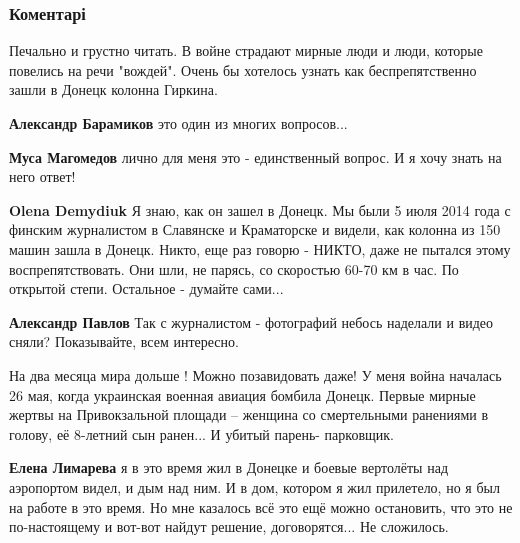  
 
 
 
 
\subsubsection{Коментарі}
\label{sec:08_10_2021.fb.magomedov_musa.avdeevka.1.vojna.cmt}

\begin{itemize} %

Печально и грустно читать. В войне страдают мирные люди и люди, которые
повелись на речи "вождей". Очень бы хотелось узнать как беспрепятственно зашли
в Донецк колонна Гиркина.

\begin{itemize} %
\textbf{Александр Барамиков} это один из многих вопросов...

\textbf{Муса Магомедов} лично для меня это - единственный вопрос. И я хочу знать на него ответ!

\textbf{Olena Demydiuk} Я знаю, как он зашел в Донецк. Мы были 5 июля 2014 года с финским журналистом в Славянске и Краматорске и видели, как колонна из 150 машин зашла в Донецк. Никто, еще раз говорю - НИКТО, даже не пытался этому воспрепятствовать. Они шли, не парясь, со скоростью 60-70 км в час. По открытой степи. Остальное - думайте сами...

\textbf{Александр Павлов} Так с журналистом - фотографий небось наделали и видео сняли? Показывайте, всем интересно.
\end{itemize} %


На два месяца мира дольше ! Можно позавидовать даже! У меня война началась 26
мая, когда украинская военная авиация бомбила Донецк. Первые мирные жертвы на
Привокзальной площади – женщина со смертельными ранениями в голову, её 8-летний
сын ранен... И убитый парень- парковщик.

\begin{itemize} %
\textbf{Елена Лимарева} я в это время жил в Донецке и боевые вертолёты над аэропортом видел, и дым над ним. И в дом, котором я жил прилетело, но я был на работе в это время. Но мне казалось всё это ещё можно остановить, что это не по-настоящему и вот-вот найдут решение, договорятся... Не сложилось.


\end{itemize}
\end{itemize}

